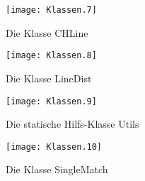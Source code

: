\begin{appendix}
\begin{landscape}
 \begin{figure}	
	\texttt{[image: Klassen.7]}
	\caption{Die Klasse CHLine}
	\label{fig:UML_CHLine}
\end{figure}

 \begin{figure}	
	\texttt{[image: Klassen.8]}
	\caption{Die Klasse LineDist}
	\label{fig:UML_LineDist}
\end{figure}

\begin{figure}	
	\texttt{[image: Klassen.9]}
	\caption{Die statische Hilfs-Klasse Utils}
	\label{fig:UML_Utils}
\end{figure}

\begin{figure}	
	\texttt{[image: Klassen.10]}
	\caption{Die Klasse SingleMatch}
	\label{fig:UML_SingleMatch}
\end{figure}

\end{landscape}
  
  
 \printindex
 \setcounter{chapter}{4}



\listoffigures
 \end{appendix}


